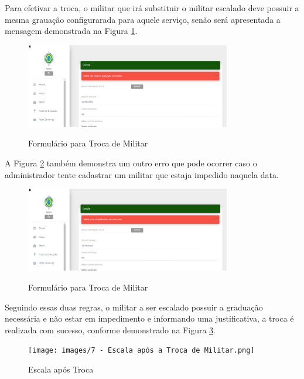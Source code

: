 Para efetivar a troca, o militar que irá substituir o militar escalado deve possuir a mesma grauação configurarada para aquele serviço, senão será apresentada a mensagem demonstrada na Figura \ref{fig:formreplaceerror}.

\begin{figure}[!htb]
    \centering
    \caption{Formulário para Troca de Militar}
    \includegraphics[width=0.8\textwidth]{images/7 - Erro Troca de Militar - Graduação.png}
    \label{fig:formreplaceerror}
\end{figure}

A Figura \ref{fig:formreplaceerror2} também demonstra um outro erro que pode ocorrer caso o administrador tente cadastrar um militar que estaja impedido naquela data.

\begin{figure}[!htb]
    \centering
    \caption{Formulário para Troca de Militar}
    \includegraphics[width=0.8\textwidth]{images/7 - Erro Troca de Militar - Impedimento.png}
    \label{fig:formreplaceerror2}
\end{figure}

Seguindo essas duas regras, o militar a ser escalado possuir a graduação necessária e não estar em impedimento e informando uma justificativa, a troca é realizada com sucesso, conforme demonstrado na Figura \ref{fig:formreplacesuccess}.

\begin{figure}[H]
    \centering
    \caption{Escala após Troca}
    \texttt{[image: images/7 - Escala após a Troca de Militar.png]}
    \label{fig:formreplacesuccess}
\end{figure}
